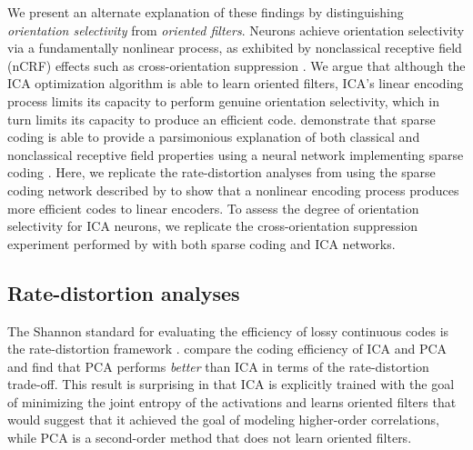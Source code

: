 We present an alternate explanation of these findings by distinguishing \textit{orientation selectivity} from \textit{oriented filters}. Neurons achieve orientation selectivity via a fundamentally nonlinear process, as exhibited by nonclassical receptive field (nCRF) effects such as cross-orientation suppression \cite{golden2016conjectures, zhu2013visual}. We argue that although the ICA optimization algorithm is able to learn oriented filters, ICA's linear encoding process limits its capacity to perform genuine orientation selectivity, which in turn limits its capacity to produce an efficient code.  demonstrate that sparse coding is able to provide a parsimonious explanation of both classical and nonclassical receptive field properties using a neural network implementing sparse coding \cite{zhu2013visual}. Here, we replicate the rate-distortion analyses from  using the sparse coding network described by  to show that a nonlinear encoding process produces more efficient codes to linear encoders. To assess the degree of orientation selectivity for ICA neurons, we replicate the cross-orientation suppression experiment performed by  with both sparse coding and ICA networks.


\subsection{Rate-distortion analyses}
The Shannon standard for evaluating the efficiency of lossy continuous codes is the rate-distortion framework \cite{cover2012elements}.  compare the  coding efficiency of ICA and PCA and find that PCA performs \textit{better} than ICA in terms of the rate-distortion trade-off. This result is surprising in that ICA is explicitly trained with the goal of minimizing the joint entropy of the activations and learns oriented filters that would suggest that it achieved the goal of modeling higher-order correlations, while PCA is a second-order method that does not learn oriented filters.

